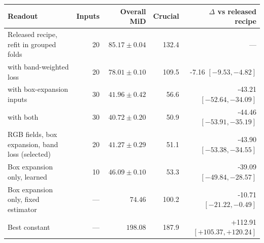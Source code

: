 \begin{tabular}{lrrrr}
\toprule
Readout & Inputs & Overall MiD & Crucial & $\Delta$ vs released recipe \\
\midrule
Released recipe, refit in grouped folds & 20 & $85.17\pm0.04$ & 132.4 & --- \\
\quad with band-weighted loss & 20 & $78.01\pm0.10$ & 109.5 & -7.16 $[-9.53,-4.82]$ \\
\quad with box-expansion inputs & 30 & $41.96\pm0.42$ & 56.6 & -43.21 $[-52.64,-34.09]$ \\
\quad with both & 30 & $40.72\pm0.20$ & 50.9 & -44.46 $[-53.91,-35.19]$ \\
RGB fields, box expansion, band loss (selected) & 20 & $41.27\pm0.29$ & 51.1 & -43.90 $[-53.38,-34.55]$ \\
Box expansion only, learned & 10 & $46.09\pm0.10$ & 53.3 & -39.09 $[-49.84,-28.57]$ \\
Box expansion only, fixed estimator & --- & $74.46$ & 100.2 & -10.71 $[-21.22,-0.49]$ \\
Best constant & --- & $198.08$ & 187.9 & +112.91 $[+105.37,+120.24]$ \\
\bottomrule
\end{tabular}
